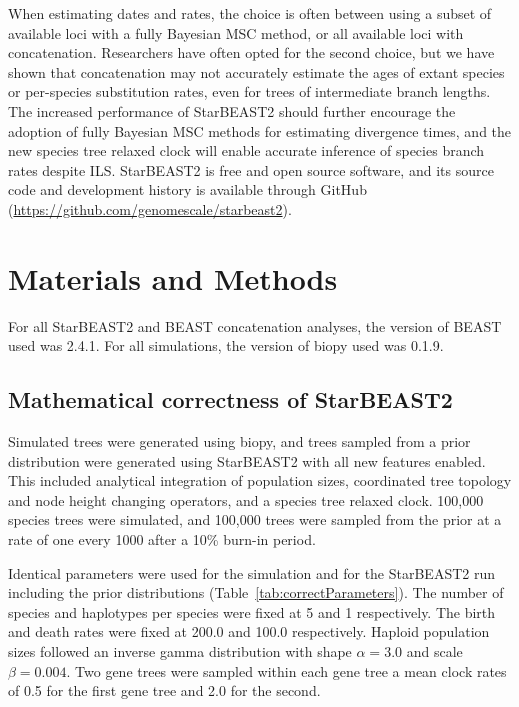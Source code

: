\documentclass[nogrid]{MBE}%
\begin{document}
When estimating dates and rates, the choice is often between using a subset of
available loci with a fully Bayesian MSC method, or all available loci with
concatenation. Researchers have often opted for the second choice, but we have
shown that concatenation may not accurately estimate the ages of extant species
or per-species substitution rates, even for trees of intermediate branch lengths. The
increased performance of StarBEAST2 should further encourage the adoption of
fully Bayesian MSC methods for estimating divergence times, and the new species
tree relaxed clock will enable accurate inference of species branch rates despite
ILS. StarBEAST2 is free and open source software, and its source code and
development history is available through GitHub
(\url{https://github.com/genomescale/starbeast2}).

\section{Materials and Methods}

For all StarBEAST2 and BEAST concatenation analyses, the version of BEAST used was
2.4.1. For all simulations, the version of biopy \citep{biopy} used was 0.1.9.

\subsection{Mathematical correctness of StarBEAST2}

Simulated trees were generated using biopy, and trees sampled from a prior
distribution were generated using StarBEAST2 with all new features enabled. This
included analytical integration of population sizes, coordinated tree topology
and node height changing operators, and a species tree relaxed clock. 100,000
species trees were simulated, and 100,000 trees were sampled from the prior at a
rate of one every 1000 after a 10\% burn-in period.

Identical parameters were used for the simulation and for the StarBEAST2 run
including the prior distributions (Table~\ref{tab:correctParameters}). The
number of species and haplotypes per species were fixed at 5 and 1 respectively.
The birth and death rates were fixed at 200.0 and 100.0 respectively. Haploid
population sizes followed an inverse gamma distribution with shape $\alpha =
3.0$ and scale $\beta = 0.004$. Two gene trees were sampled within each gene
tree a mean clock rates of 0.5 for the first gene tree and 2.0 for the second.
\end{document}
